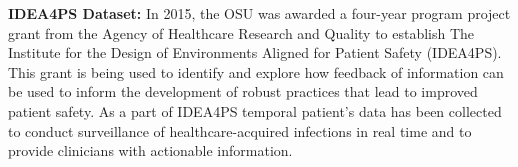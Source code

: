 %

%



{\bf IDEA4PS Dataset:}
In 2015, the OSU was awarded a four-year program project grant from the Agency of Healthcare Research and Quality to establish The Institute for the Design of Environments Aligned for Patient Safety (IDEA4PS). This grant is being used to identify and explore how feedback of information can be used to inform the development of robust practices that lead to improved patient safety. As a part of IDEA4PS temporal patient's data has been collected to conduct surveillance of healthcare-acquired infections in real time and to provide clinicians with actionable information.

